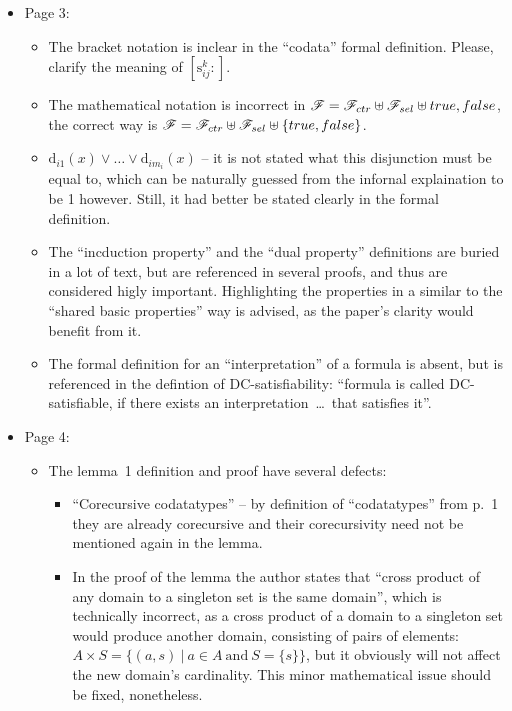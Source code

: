 \begin{itemize}
	\item Page 3:
	\begin{itemize}
		\item The bracket notation is inclear in the ``codata'' formal definition. Please, clarify the meaning of $\left[ \mathrm{s}^{k}_{ij} : \right]$.
		\item The mathematical notation is incorrect in $\mathscr{F} = \mathscr{F}_{ctr} \uplus \mathscr{F}_{sel} \uplus true,false$, the correct way is $\mathscr{F} = \mathscr{F}_{ctr} \uplus \mathscr{F}_{sel} \uplus \{true,false\}$.
		\item $\mathrm{d}_{i1}(x) \lor \dots \lor \mathrm{d}_{im_i}(x)$ -- it is not stated what this disjunction must be equal to, which can be naturally guessed from the infornal explaination to be 1 however. Still, it had better be stated clearly in the formal definition.
		\item The ``incduction property'' and the ``dual property'' definitions are buried in a lot of text, but are referenced in several proofs, and thus are considered higly important. Highlighting the properties in a similar to the ``shared basic properties'' way is advised, as the paper's clarity would benefit from it.
		\item The formal definition for an ``interpretation'' of a formula is absent, but is referenced in the defintion of DC-satisfiability: ``formula is called DC-satisfiable, if there exists an interpretation~\dots~that satisfies it''.
	\end{itemize}

	\item Page 4:
	\begin{itemize}
		\item The lemma~1 definition and proof have several defects:
		\begin{itemize}
			\item ``Corecursive codatatypes'' -- by definition of ``codatatypes'' from p.~1 they are already corecursive and their corecursivity need not be mentioned again in the lemma.
			\item In the proof of the lemma the author states that ``cross product of any domain to a singleton set is the same domain'', which is technically incorrect, as a cross product of a domain to a singleton set would produce another domain, consisting of pairs of elements: $A \times S = \{ (a, s)~|~a \in A~\mathrm{and}~S = \{s\} \}$, but it obviously will not affect the new domain's cardinality. This minor mathematical issue should be fixed, nonetheless.
		\end{itemize}
	\end{itemize}


\end{itemize}
